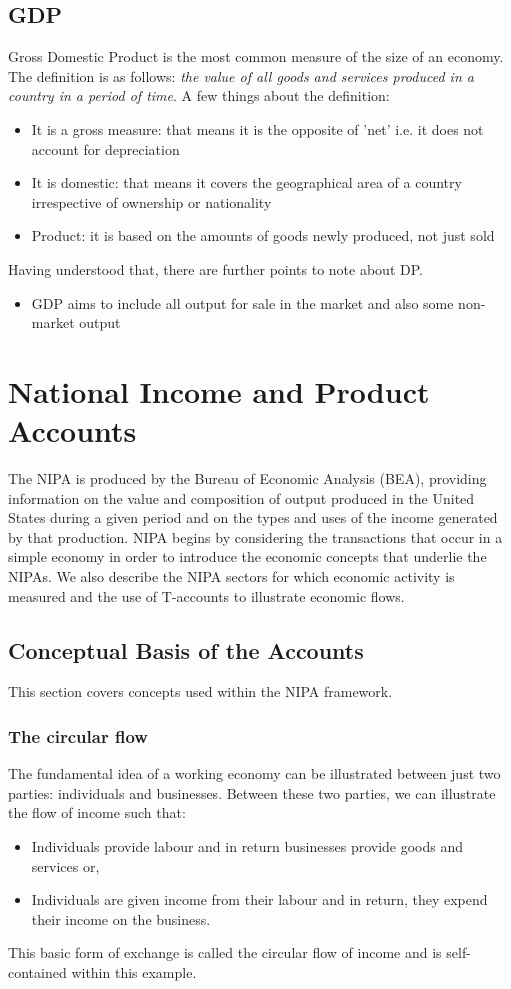 \documentclass[12pt, letterpaper]{article}
\begin{document}
{\subsection{GDP}
Gross Domestic Product is the most common measure of the size of an economy. The definition is as follows: \textit{the value of all goods and services produced in a country in a period of time}. A few things about the definition:
\begin{itemize}
	\item It is a gross measure: that means it is the opposite of 'net' i.e. it does not account for depreciation
	\item It is domestic: that means it covers the geographical area of a country irrespective of ownership or nationality
	\item Product: it is based on the amounts of goods newly produced, not just sold
\end{itemize}
Having understood that, there are further points to note about DP.
\begin{itemize}
	\item GDP aims to include all output for sale in the market and also some non-market output
\end{itemize}

\section{National Income and Product Accounts}
The NIPA is produced by the Bureau of Economic Analysis (BEA), providing information on the value and composition of output produced in the United States during a given period and on the types and uses of the income generated by that production. NIPA begins by considering the transactions that occur in a simple economy in order to introduce the economic concepts that underlie the NIPAs. We also describe the NIPA sectors for which economic activity is measured and the use of T-accounts to illustrate economic flows.

\subsection{Conceptual Basis of the Accounts}
This section covers concepts used within the NIPA framework.
\subsubsection{The circular flow}
The fundamental idea of a working economy can be illustrated between just two parties: individuals and businesses. Between these two parties, we can illustrate the flow of income such that:
\begin{itemize}
	\item Individuals provide labour and in return businesses provide goods and services or,
	\item Individuals are given income from their labour and in return, they expend their income on the business.
\end{itemize}
This basic form of exchange is called the circular flow of income and is self-contained within this example.

}
\end{document}
